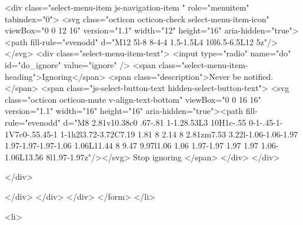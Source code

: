                 <div class="select-menu-item js-navigation-item " role="menuitem" tabindex="0">
                  <svg class="octicon octicon-check select-menu-item-icon" viewBox="0 0 12 16" version="1.1" width="12" height="16" aria-hidden="true"><path fill-rule="evenodd" d="M12 5l-8 8-4-4 1.5-1.5L4 10l6.5-6.5L12 5z"/></svg>
                  <div class="select-menu-item-text">
                    <input type="radio" name="do" id="do_ignore" value="ignore" />
                    <span class="select-menu-item-heading">Ignoring</span>
                    <span class="description">Never be notified.</span>
                    <span class="js-select-button-text hidden-select-button-text">
                      <svg class="octicon octicon-mute v-align-text-bottom" viewBox="0 0 16 16" version="1.1" width="16" height="16" aria-hidden="true"><path fill-rule="evenodd" d="M8 2.81v10.38c0 .67-.81 1-1.28.53L3 10H1c-.55 0-1-.45-1-1V7c0-.55.45-1 1-1h2l3.72-3.72C7.19 1.81 8 2.14 8 2.81zm7.53 3.22l-1.06-1.06-1.97 1.97-1.97-1.97-1.06 1.06L11.44 8 9.47 9.97l1.06 1.06 1.97-1.97 1.97 1.97 1.06-1.06L13.56 8l1.97-1.97z"/></svg>
                        Stop ignoring
                    </span>
                  </div>
                </div>

              </div>

            </div>
          </div>
        </div>
</form>
  </li>

  <li>
    
